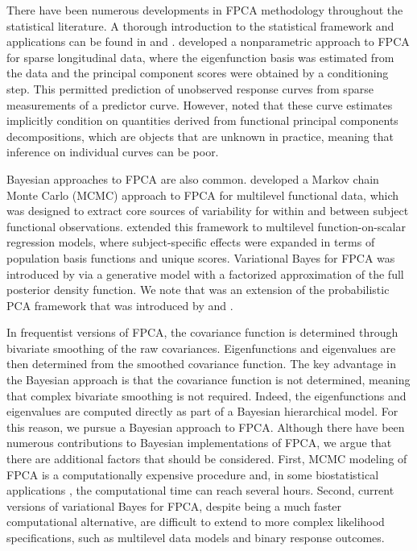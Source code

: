 \documentclass[12pt]{article}
\theoremstyle{plain}
\theoremstyle{definition}
\theoremstyle{remark}
\begin{document}
There have been numerous developments in FPCA methodology throughout the statistical literature.
A thorough introduction to the statistical framework and applications can be found in 
and .  developed a nonparametric approach to FPCA
for sparse longitudinal data, where the eigenfunction basis was estimated from the data and the
principal component scores were obtained by a conditioning step. This permitted
prediction of unobserved response curves from sparse measurements of a predictor curve. However,
 noted that these curve estimates implicitly condition on quantities derived from functional
principal components decompositions, which are objects that are unknown in practice, meaning that inference on
individual curves can be poor.

Bayesian approaches to FPCA are also common.  developed a Markov chain Monte Carlo (MCMC)
approach to FPCA for multilevel functional data, which was designed to extract core sources of variability for within and
between subject functional observations.  extended this framework to multilevel function-on-scalar
regression models, where subject-specific effects were expanded in terms of population basis functions and unique
scores. Variational Bayes for FPCA was introduced by  via a generative model with a
factorized approximation of the full posterior density function. We note that  was an extension
of the probabilistic PCA framework that was introduced by  and .

In frequentist versions of FPCA, the covariance function is determined through bivariate smoothing of the raw
covariances. Eigenfunctions and eigenvalues are then determined from the smoothed covariance function.
The key advantage in the Bayesian approach is that the covariance function is not determined, meaning that
complex bivariate smoothing is not required. Indeed, the eigenfunctions and eigenvalues are computed directly
as part of a Bayesian hierarchical model. For this reason, we pursue a Bayesian approach to FPCA.
Although there have been numerous contributions to Bayesian implementations of FPCA, we argue that there are
additional factors that should be considered. First, MCMC modeling of FPCA is a computationally expensive
procedure and, in some biostatistical applications \cite{Goldsmith15}, the computational time can reach several
hours. Second, current versions of variational Bayes for FPCA, despite being a much faster computational alternative,
are difficult to extend to more complex likelihood specifications, such as multilevel data models and binary response
outcomes.
\end{document}
